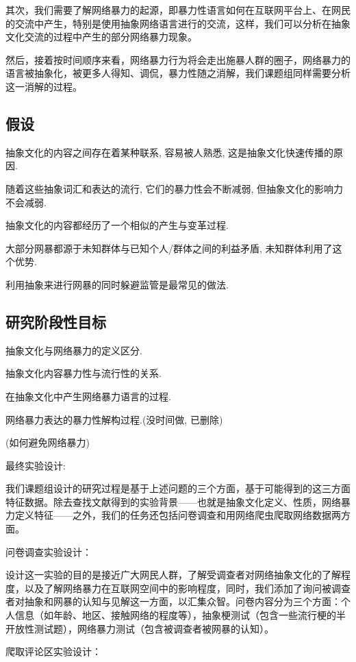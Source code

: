 \documentclass[12pt,a4paper]{ctexart}
\begin{document}
其次，我们需要了解网络暴力的起源，即暴力性语言如何在互联网平台上、在网民的交流中产生，特别是使用抽象网络语言进行的交流，这样，我们可以分析在抽象文化交流的过程中产生的部分网络暴力现象。

然后，接着按时间顺序来看，网络暴力行为将会走出施暴人群的圈子，网络暴力的语言被抽象化，被更多人得知、调侃，暴力性随之消解，我们课题组同样需要分析这一消解的过程。

\subsection{假设}%

抽象文化的内容之间存在着某种联系, 容易被人熟悉, 这是抽象文化快速传播的原因.

随着这些抽象词汇和表达的流行, 它们的暴力性会不断减弱, 但抽象文化的影响力不会减弱.

抽象文化的内容都经历了一个相似的产生与变革过程.

大部分网暴都源于未知群体与已知个人/群体之间的利益矛盾, 未知群体利用了这个优势.

利用抽象来进行网暴的同时躲避监管是最常见的做法.

\subsection{研究阶段性目标}

抽象文化与网络暴力的定义区分.

抽象文化内容暴力性与流行性的关系.

在抽象文化中产生网络暴力语言的过程.

网络暴力表达的暴力性解构过程.(没时间做, 已删除)

(如何避免网络暴力)

最终实验设计:

我们课题组设计的研究过程是基于上述问题的三个方面，基于可能得到的这三方面特征数据。除去查找文献得到的实验背景——也就是抽象文化定义、性质，网络暴力定义特征——之外，我们的任务还包括问卷调查和用网络爬虫爬取网络数据两方面。

问卷调查实验设计：

设计这一实验的目的是接近广大网民人群，了解受调查者对网络抽象文化的了解程度，以及了解网络暴力在互联网空间中的影响程度，同时，我们添加了询问被调查者对抽象和网暴的认知与见解这一方面，以汇集众智。问卷内容分为三个方面：个人信息（如年龄、地区、接触网络的程度等），抽象梗测试（包含一些流行梗的半开放性测试题），网络暴力测试（包含被调查者被网暴的认知）。

爬取评论区实验设计：
\end{document}
